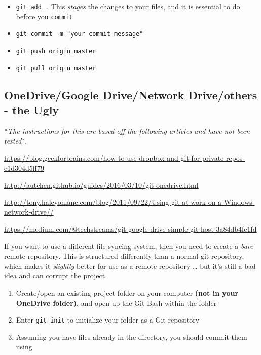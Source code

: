 \documentclass[]{book}
\providecommand{\tightlist}{%
  \setlength{\itemsep}{0pt}\setlength{\parskip}{0pt}}
\begin{document}
\begin{itemize}
\tightlist
\item
  \texttt{git\ add\ .} This \emph{stages} the changes to your files, and it is essential to do before you \texttt{commit}
\item
  \texttt{git\ commit\ -m\ "your\ commit\ message"}
\item
  \texttt{git\ push\ origin\ master}
\item
  \texttt{git\ pull\ origin\ master}
\end{itemize}

\hypertarget{onedrivegoogle-drivenetwork-driveothers---the-ugly}{%
\subsection{OneDrive/Google Drive/Network Drive/others - the Ugly}\label{onedrivegoogle-drivenetwork-driveothers---the-ugly}}

*\emph{The instructions for this are based off the following articles and have not been tested}*.

\url{https://blog.geekforbrains.com/how-to-use-dropbox-and-git-for-private-repos-e1d304d5ff79}

\url{http://autchen.github.io/guides/2016/03/10/git-onedrive.html}

\url{http://tony.halcyonlane.com/blog/2011/09/22/Using-git-at-work-on-a-Windows-network-drive//}

\url{https://medium.com/@techstreams/git-google-drive-simple-git-host-3a84db4fc1fd}

If you want to use a different file syncing system, then you need to create a \emph{bare} remote repository. This is structured differently than a normal git repository, which makes it \emph{slightly} better for use as a remote repository \ldots{} but it's still a bad idea and can corrupt the project.

\begin{enumerate}
\def\labelenumi{\arabic{enumi}.}
\tightlist
\item
  Create/open an existing project folder on your computer \textbf{(not in your OneDrive folder)}, and open up the Git Bash within the folder
\item
  Enter \texttt{git\ init} to initialize your folder as a Git repository
\item
  Assuming you have files already in the directory, you should commit them using
\end{enumerate}
\end{document}
